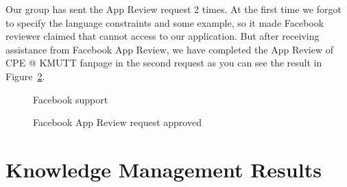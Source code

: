 \documentclass[12pt,oneside,openright,a4paper]{cpe-english-project}
\begin{document}
	Our group has sent the App Review request 2 times. At the first time we forgot to specify the
	language constraints and some example, so it made Facebook reviewer claimed that
	cannot access to our application. But after receiving assistance from Facebook App Review,
	we have completed the App Review of CPE @ KMUTT fanpage in the second request
	as you can see the result in Figure~\ref*{fig:app_review_approved}.

	\begin{figure}[!h]\centering
		\caption{Facebook support}\label{fig:Facebook support}
	\end{figure}

	\begin{figure}[!h]\centering
		\caption{Facebook App Review request approved}\label{fig:app_review_approved}
	\end{figure}

\pagebreak
\section{Knowledge Management Results}
\end{document}
